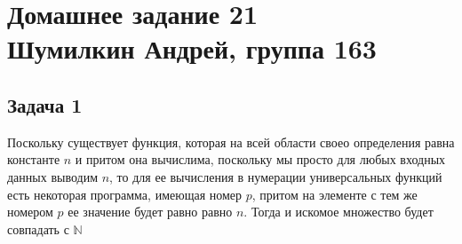 

	\section{Домашнее задание 21\\ Шумилкин Андрей, группа 163} 
	\subsection{Задача 1}
	Поскольку существует функция, которая на всей области своео определения равна константе $n$ и притом она вычислима, поскольку мы просто для любых входных данных выводим $n$, то для ее вычисления в нумерации универсальных функций есть некоторая программа, имеющая номер $p$, притом на элементе с тем же номером $p$ ее значение будет равно равно $n$. Тогда и искомое множество будет совпадать с $\mathbb{N}$
	
	
	
